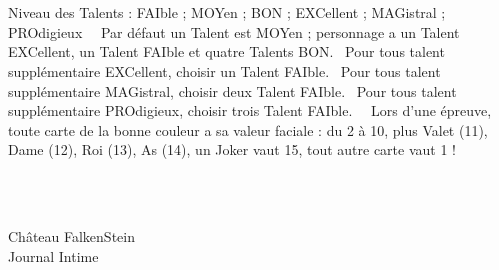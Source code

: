 \documentclass[a5paper]{letter}
\begin{document}
{{	~\\~\\

\begin{minipage}[ht]{0.75\textwidth}
	Niveau des Talents : FAIble ; MOYen ; BON ; EXCellent ; MAGistral ; PROdigieux~\newline~\newline
	Par défaut un Talent est MOYen ; personnage a un Talent EXCellent, un Talent FAIble et quatre Talents BON.~\newline
	Pour tous talent supplémentaire EXCellent, choisir un Talent FAIble.~\newline
	Pour tous talent supplémentaire MAGistral, choisir deux Talent FAIble.~\newline
	Pour tous talent supplémentaire PROdigieux, choisir trois Talent FAIble.~\newline~\newline
	Lors d'une épreuve, toute carte de la bonne couleur a sa valeur faciale : du 2 à 10, plus Valet (11), Dame (12), Roi (13), As (14), un Joker vaut 15, tout autre carte vaut 1 !
\end{minipage}~\\~\\


\clearpage

{\centering \Huge{Château FalkenStein}~\\
{\centering \large{Journal Intime}~\\



}}}}
\end{document}
